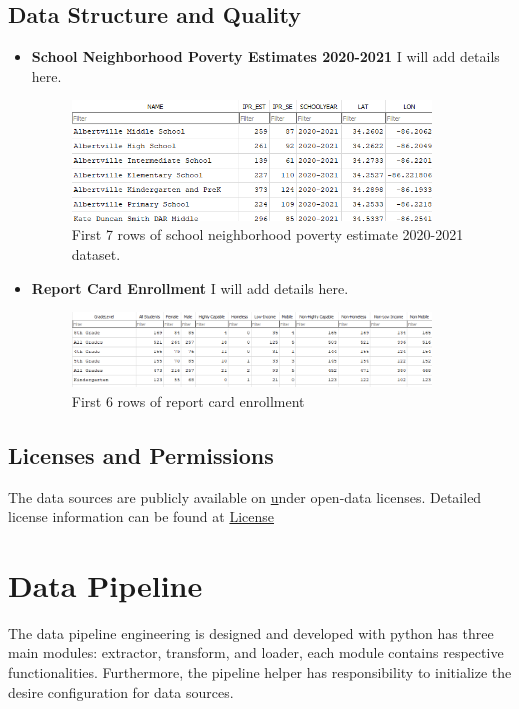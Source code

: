 \documentclass[a4paper,11pt]{article}
\begin{document}
    \subsection{Data Structure and Quality}
    \begin{itemize}
    \item \textbf{School Neighborhood Poverty Estimates 2020-2021}  I will add details here.

    \begin{figure}[ht!]
        \centering
        \includegraphics[width=0.9\textwidth]{images/SchoolNeighborhoodPovertyData.png}
        \caption{First 7 rows of school neighborhood poverty estimate 2020-2021 dataset.}
        \label{fig:dataset1}
    \end{figure}

    \item \textbf{Report Card Enrollment} I will add details here.

    \begin{figure}[ht!]
        \centering
        \includegraphics[width=0.9\textwidth]
        {images/ReportCardEnrollmentData.png}
        \caption{First 6 rows of report card enrollment}
        \label{fig:dataset2}
    \end{figure}
    \end{itemize}

    \subsection{Licenses and Permissions}
    The data sources are publicly available on \href{https://catalog.data.gov//} under open-data licenses. Detailed license information can be found at
    \href{https://resources.data.gov/open-licenses/}{License}

\section{Data Pipeline}
    The data pipeline engineering is designed and developed with python has three main modules: extractor, transform, and loader, each module contains respective functionalities. Furthermore, the pipeline helper has responsibility to initialize the desire configuration for data sources.
\end{document}
